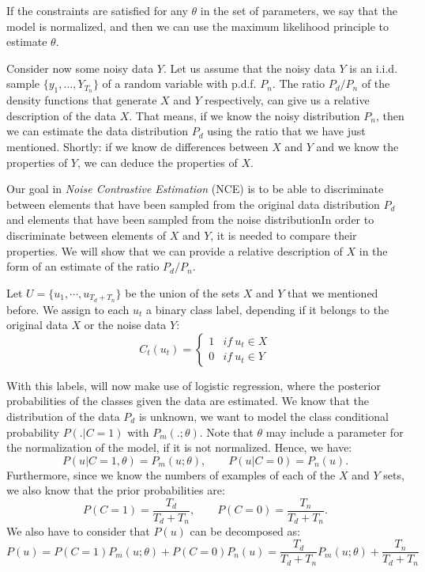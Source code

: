 If the constraints are satisfied for any $\theta$ in the set of parameters, we say that the model is normalized, and then we can use the maximum likelihood principle to estimate $\theta$.

Consider now some noisy data $Y$. Let us assume that the noisy data $Y$ is an i.i.d. sample $\{y_1,\dots,Y_{T_n}\}$ of a random variable with p.d.f. $P_n$. The ratio $P_d/P_n$ of the density functions that generate $X$ and $Y$ respectively, can give us a relative description of the data $X$. That means, if we know the noisy distribution $P_n$, then we can estimate the data distribution $P_d$ using the ratio that we have just mentioned. Shortly: if we know de differences between $X$ and $Y$ and we know the properties of $Y$, we can deduce the properties of $X$.

Our goal in \emph{Noise Contrastive Estimation} (NCE) is to be able to discriminate between elements that have been sampled from the original data distribution $P_d$ and elements that have been sampled from the noise distributionIn order to discriminate between elements of $X$ and $Y$, it is needed to compare their properties. We will show that we can provide a relative description of $X$ in the form of an estimate of the ratio $P_d/P_n$.


Let $U = \{u_1,\cdots,u_{T_d + T_n}\}$ be the union of the sets $X$ and $Y$ that we mentioned before. We assign to each $u_t$ a binary class label, depending if it belongs to the original data $X$ or the noise data $Y$:
\[
C_t(u_t) = \begin{cases}
1 & if \ u_t \in X\\
0 & if \ u_t \in Y
\end{cases}
\]

With this labels, will now make use of logistic regression, where the posterior probabilities of the classes given the data are estimated. We know that the distribution of the data $P_d$ is unknown, we want to model the class conditional probability $P(.|C=1)$ with $P_m(.;\theta)$. Note that $\theta$ may include a parameter for the normalization of the model, if it is not normalized. Hence, we have:
\[
P(u|C = 1,\theta) = P_m(u;\theta), \quad \quad P(u|C = 0) = P_n(u).
\]
Furthermore, since we know the numbers of examples of each of the $X$ and $Y$ sets, we also know that the prior probabilities are:
\[
P(C = 1) = \frac{T_d}{T_d + T_n}, \quad \quad P(C = 0) = \frac{T_n}{T_d + T_n}.
\]
We also have to consider that $P(u)$ can be decomposed as:
\[
P(u) = P(C = 1) P_m(u; \theta) + P(C = 0)P_n(u) = \frac{T_d}{T_d + T_n} P_m(u;\theta) + \frac{T_n}{T_d + T_n}   
\]

